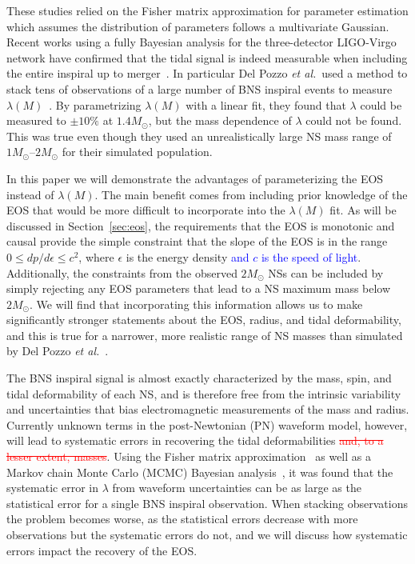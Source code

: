 \documentclass[twocolumn,prd,amssymb,aps,nofootinbib,showpacs,epsf]{revtex4}
\newcommand\ben[2]{\textcolor{red}{{#1}\sout{#2}}}
\newcommand\les[2]{\textcolor{blue}{{#1}\sout{#2}}}
\begin{document}
These studies relied on the Fisher matrix approximation for parameter estimation which assumes the distribution of parameters follows a multivariate Gaussian. Recent works using a fully Bayesian analysis for the three-detector LIGO-Virgo network have confirmed that the tidal signal is indeed measurable when including the entire inspiral up to merger~\cite{DelPozzoLiAgathos2013, WadeCreightonOchsner2014}. In particular Del Pozzo {\it et al.}\ used a method to stack tens of observations of a large number of BNS inspiral events to measure $\lambda(M)$~\cite{DelPozzoLiAgathos2013}. By parametrizing $\lambda(M)$ with a linear fit, they found that $\lambda$ could be measured to $\pm 10\%$ at $1.4M_\odot$, but the mass dependence of $\lambda$ could not be found. This was true even though they used an unrealistically large NS mass range of $1M_\odot$--$2M_\odot$ for their simulated population.

In this paper we will demonstrate the advantages of parameterizing the EOS instead of $\lambda(M)$. The main benefit comes from including prior knowledge of the EOS that would be more difficult to incorporate into the $\lambda(M)$ fit. As will be discussed in Section~\ref{sec:eos}, the requirements that the EOS is monotonic and causal provide the simple constraint that the slope of the EOS is in the range $0 \le dp/d\epsilon \le c^2$, where $\epsilon$ is the energy density \les{and $c$ is the speed of light}{}. Additionally, the constraints from the observed $2M_\odot$ NSs can be included by simply rejecting any EOS parameters that lead to a NS maximum mass below $2M_\odot$. We will find that incorporating this information allows us to make significantly stronger statements about the EOS, radius, and tidal deformability, and this is true for a narrower, more realistic range of NS masses than simulated by Del Pozzo {\it et al.}~\cite{DelPozzoLiAgathos2013}.

The BNS inspiral signal is almost exactly characterized by the mass, spin, and tidal deformability of each NS, and is therefore free from the intrinsic variability and uncertainties that bias electromagnetic measurements of the mass and radius. Currently unknown terms in the post-Newtonian (PN) waveform model, however, will lead to systematic errors in recovering the tidal deformabilities \ben{}{and, to a lesser extent, masses}. Using the Fisher matrix approximation~\cite{Favata2014, YagiYunes2014} as well as a Markov chain Monte Carlo (MCMC) Bayesian analysis~\cite{WadeCreightonOchsner2014}, it was found that the systematic error in $\lambda$ from waveform uncertainties can be as large as the statistical error for a single BNS inspiral observation. When stacking observations the problem becomes worse, as the statistical errors decrease with more observations but the systematic errors do not, and we will discuss how systematic errors impact the recovery of the EOS.
\end{document}
